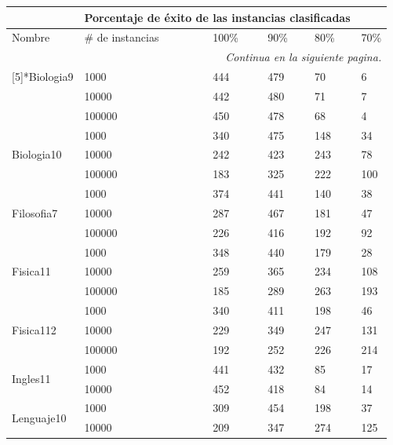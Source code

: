\begin{longtable}{|p{3cm}|p{3cm}|p{2cm}|p{2cm}|p{2cm}|p{2cm}|}
\hline
	\rowcolor[gray]{0.5} 
	\multicolumn{2}{|c|}{Vista minable} &
	\multicolumn{4}{|c|}{Porcentaje de éxito de las instancias clasificadas}\\
	\hline
	\rowcolor[gray]{0.9} 
	Nombre & \# de instancias & 100\% & 90\% & 80\% & 70\%\\
	\hline
	\endhead
	\hline
	\multicolumn{6}{r}{\textit{Continua en la siguiente pagina.}} \\
	\endfoot
	\endlastfoot
\multirow{3}[5]{*}{Biologia9} & 1000  & 444   & 479   & 70    & 6 \\
\cline{2-6}      & 10000 & 442   & 480   & 71    & 7 \\
\cline{2-6}      & 100000 & 450   & 478   & 68    & 4 \\
\hline
\multirow{3}[6]{*}{Biologia10} & 1000  & 340   & 475   & 148   & 34 \\
\cline{2-6}      & 10000 & 242   & 423   & 243   & 78 \\
\cline{2-6}      & 100000 & 183   & 325   & 222   & 100 \\
\hline
\multirow{3}[6]{*}{Filosofia7} & 1000  & 374   & 441   & 140   & 38 \\
\cline{2-6}      & 10000 & 287   & 467   & 181   & 47 \\
\cline{2-6}      & 100000 & 226   & 416   & 192   & 92 \\
\hline
\multirow{3}[6]{*}{Fisica11} & 1000  & 348   & 440   & 179   & 28 \\
\cline{2-6}      & 10000 & 259   & 365   & 234   & 108 \\
\cline{2-6}      & 100000 & 185   & 289   & 263   & 193 \\
\hline
\multirow{3}[6]{*}{Fisica112} & 1000  & 340   & 411   & 198   & 46 \\
\cline{2-6}      & 10000 & 229   & 349   & 247   & 131 \\
\cline{2-6}      & 100000 & 192   & 252   & 226   & 214 \\
\hline
\multirow{2}[4]{*}{Ingles11} & 1000  & 441   & 432   & 85    & 17 \\
\cline{2-6}      & 10000 & 452   & 418   & 84    & 14 \\
\hline
\multirow{3}[6]{*}{Lenguaje10} & 1000  & 309   & 454   & 198   & 37 \\
\cline{2-6}      & 10000 & 209   & 347   & 274   & 125 \\

\end{longtable}

